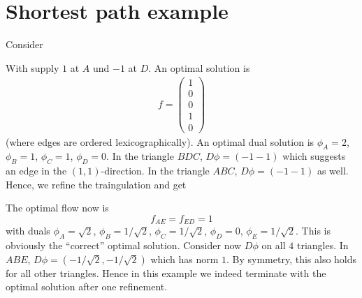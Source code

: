 \documentclass[10pt,a4paper]{article}
\begin{document}
\section{Shortest path example}
Consider
\begin{center}

\end{center}
With supply $1$ at $A$ und $-1$ at $D$. An optimal solution is
\begin{align*}
f = \begin{pmatrix}
1\\0\\0\\1\\0
\end{pmatrix}
\end{align*}
(where edges are ordered lexicographically). An optimal dual solution is $\phi_A = 2$, $\phi_B = 1$, $\phi_C = 1$, $\phi_D = 0$. In the triangle $BDC$, $D\phi = (-1 -1)$ which suggests an edge in the $(1,1)$-direction. In the triangle $ABC$, $D\phi = (-1 -1)$ as well. Hence, we refine the traingulation and get
\begin{center}
\end{center}
The optimal flow now is
\[
f_{AE}=f_{ED}=1
\]
with duals $\phi_A = \sqrt{2}$, $\phi_B = 1/\sqrt{2}$, $\phi_C = 1/\sqrt{2}$, $\phi_D = 0$, $\phi_E = 1/\sqrt{2}$. This is obviously the ``correct'' optimal solution. Consider now $D\phi$ on all $4$ triangles. In $ABE$, $D\phi = (-1/\sqrt{2},-1/\sqrt{2})$ which has norm $1$. By symmetry, this also holds for all other triangles. Hence in this example we indeed terminate with the optimal solution after one refinement.
\end{document}
